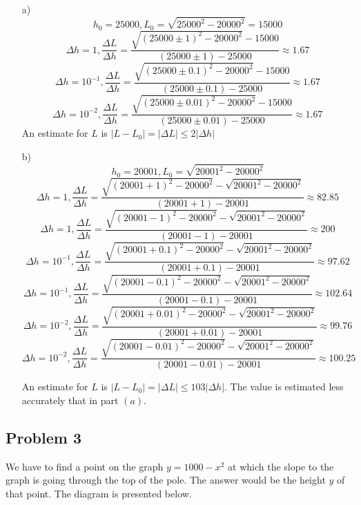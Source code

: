 \documentclass{article}
\begin{document}
\begin{itemize}
    \item[a)] 
\[h_0 = 25000, L_0 = \sqrt{25000^2-20000^2} = 15000\]
\[\Delta h = 1, \frac{\Delta L}{\Delta h} = \frac{\sqrt{(25000\pm1)^2-20000^2} - 15000}{(25000\pm1)-25000} \approx 1.67 \]
\[\Delta h = 10^{-1}, \frac{\Delta L}{\Delta h} = \frac{\sqrt{(25000\pm0.1)^2-20000^2} - 15000}{(25000\pm0.1)-25000}
\approx 1.67 \]
\[\Delta h = 10^{-2}, \frac{\Delta L}{\Delta h} = \frac{\sqrt{(25000\pm0.01)^2-20000^2} - 15000}{(25000\pm0.01)-25000}
\approx 1.67 \]\textbf{}
An estimate for $L$ is $|L-L_0| = |\Delta L| \leq 2|\Delta h|$

    \item[b)]
\[h_0 = 20001, L_0 = \sqrt{20001^2-20000^2}\]
\[\Delta h = 1, \frac{\Delta L}{\Delta h} = \frac{\sqrt{(20001+1)^2-20000^2} - \sqrt{20001^2-20000^2}}{(20001+1)-20001} \approx 82.85 \]
\[\Delta h = 1, \frac{\Delta L}{\Delta h} = \frac{\sqrt{(20001-1)^2-20000^2} - \sqrt{20001^2-20000^2}}{(20001-1)-20001} \approx 200 \]
\[\Delta h = 10^{-1}, \frac{\Delta L}{\Delta h} = \frac{\sqrt{(20001+0.1)^2-20000^2} - \sqrt{20001^2-20000^2}}{(20001+0.1)-20001} \approx 97.62 \]
\[\Delta h = 10^{-1}, \frac{\Delta L}{\Delta h} = \frac{\sqrt{(20001-0.1)^2-20000^2} - \sqrt{20001^2-20000^2}}{(20001-0.1)-20001} \approx 102.64 \]
\[\Delta h = 10^{-2}, \frac{\Delta L}{\Delta h} = \frac{\sqrt{(20001+0.01)^2-20000^2} - \sqrt{20001^2-20000^2}}{(20001+0.01)-20001} \approx 99.76 \]
\[\Delta h = 10^{-2}, \frac{\Delta L}{\Delta h} = \frac{\sqrt{(20001-0.01)^2-20000^2} - \sqrt{20001^2-20000^2}}{(20001-0.01)-20001} \approx 100.25 \]

An estimate for $L$ is $|L-L_0| = |\Delta L| \leq 103|\Delta h|$. The value is estimated less accurately that in part $(a)$.
\end{itemize}    
\subsection{Problem 3}

We have to find a point on the graph $y=1000-x^2$ at which the slope to the graph is going through the top of the pole. The answer would be the height $y$ of that point. The diagram is presented below.
\\
\\

\end{document}
